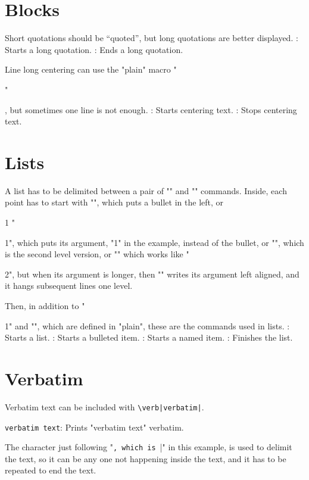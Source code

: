 \section{Blocks}

Short quotations should be “quoted”,
but long quotations are better displayed.
\command\begincitation: Starts a long quotation.
\command\endcitation: Ends a long quotation.

Line long centering can use the
"plain" macro "\centerline",
but sometimes one line is not enough.
\command\begincenter: Starts centering text.
\command\endcenter: Stops centering text.


\section{Lists}

A list has to be delimited between a pair of
"\beginpoints" and "\endpoints" commands.
Inside, each point has to start with
\beginpoints
\point "\point", which puts a bullet in the left, or
 \item{1} "\item{1}", which puts its argument, "1" in the example,
 instead of the bullet, or
  "", which is the second level
 version, or
\point[2] "\point[2]" which works like "\item{2}", but
 when its argument is longer, then
 "" writes its
 argument left aligned, and it hangs subsequent lines
 one level.
\endpoints

Then, in addition to "\item{1}" and "",
which are defined in "plain",
these are the commands used in lists.
\command\beginpoints: Starts a list.
\command\point: Starts a bulleted item.
\command\point[Title]: Starts a named item.
\command\endpoints: Finishes the list.



\section{Verbatim}

Verbatim text can be included with \verb!\verb|verbatim|!.

\command\verb|verbatim text|: Prints "verbatim text" verbatim.

The character just following "\verb", which is "|" in this example,
is used to delimit the text, so it can be any one not happening
inside the text, and it has to be repeated to end the text.

